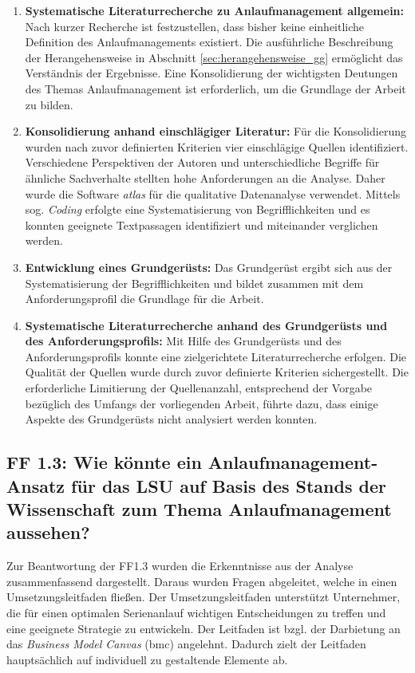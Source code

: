 \begin{enumerate}
 \item \textbf{Systematische Literaturrecherche zu Anlaufmanagement allgemein: } Nach kurzer Recherche ist festzustellen, dass bisher keine einheitliche Definition des Anlaufmanagements existiert. 
 Die ausführliche Beschreibung der Herangehensweise in Abschnitt \ref{sec:herangehensweise_gg} ermöglicht das Verständnis der Ergebnisse. 
 Eine Konsolidierung der wichtigsten Deutungen des Themas Anlaufmanagement ist erforderlich, um die Grundlage der Arbeit zu bilden. 
 \item \textbf{Konsolidierung anhand einschlägiger Literatur: } Für die Konsolidierung wurden nach zuvor definierten Kriterien vier einschlägige Quellen identifiziert. 
 Verschiedene Perspektiven der Autoren und unterschiedliche Begriffe für ähnliche Sachverhalte stellten hohe Anforderungen an die Analyse. Daher wurde die Software \textit{\gls{atlas}} für die qualitative Datenanalyse verwendet. Mittels sog. \textit{Coding} erfolgte eine Systematisierung von Begrifflichkeiten und es konnten geeignete Textpassagen identifiziert und miteinander verglichen werden. 
 \item \textbf{Entwicklung eines Grundgerüsts: } Das Grundgerüst ergibt sich aus der Systematisierung der Begrifflichkeiten und bildet zusammen mit dem Anforderungsprofil die Grundlage für die Arbeit. 
 \item \textbf{Systematische Literaturrecherche anhand des Grundgerüsts und des Anforderungsprofils: } Mit Hilfe des Grundgerüsts und des Anforderungsprofils konnte eine zielgerichtete Literaturrecherche erfolgen. Die Qualität der Quellen wurde durch zuvor definierte Kriterien sichergestellt. 
 Die erforderliche Limitierung der Quellenanzahl, entsprechend der Vorgabe bezüglich des Umfangs der vorliegenden Arbeit, führte dazu, dass einige Aspekte des Grundgerüsts nicht analysiert werden konnten. 
\end{enumerate}

\subsection*{FF 1.3: Wie könnte ein Anlaufmanagement-Ansatz für das LSU auf Basis des Stands der Wissenschaft zum Thema Anlaufmanagement aussehen?}
Zur Beantwortung der FF1.3 wurden die Erkenntnisse aus der Analyse zusammenfassend dargestellt. Daraus wurden Fragen abgeleitet, welche in einen Umsetzungsleitfaden fließen. Der Umsetzungsleitfaden unterstützt Unternehmer, die für einen optimalen Serienanlauf wichtigen Entscheidungen zu treffen und eine geeignete Strategie zu entwickeln. Der Leitfaden ist bzgl. der Darbietung an das \textit{Business Model Canvas} (\gls{bmc}) %
angelehnt. Dadurch zielt der Leitfaden hauptsächlich auf individuell zu gestaltende Elemente ab.

